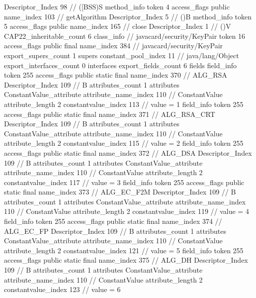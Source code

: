 {{{{{					Descriptor_Index	98		// ([BSS)S
				}
				method_info {
					token	4
					access_flags	public
					name_index	103		// getAlgorithm
					Descriptor_Index	5		// ()B
				}
				method_info {
					token	5
					access_flags	public
					name_index	165		// close
					Descriptor_Index	1		// ()V
				}
			}
			CAP22_inheritable_count	6
		}
		class_info {		// javacard/security/KeyPair
			token	16
			access_flags	public final
			name_index	384		// javacard/security/KeyPair
			export_supers_count	1
			supers {
				constant_pool_index	11		// java/lang/Object
			}
			export_interfaces_count	0
			interfaces {
			}
			export_fields_count	6
			fields {
			field_info {
				token	255
				access_flags	public static final
				name_index	370		// ALG_RSA
				Descriptor_Index	109		// B
				attributes_count	1
				attributes {
				ConstantValue_attribute {
					attribute_name_index	110		// ConstantValue
					attribute_length	2
					constantvalue_index	113		// value = 1
				}
				}
			}
			field_info {
				token	255
				access_flags	public static final
				name_index	371		// ALG_RSA_CRT
				Descriptor_Index	109		// B
				attributes_count	1
				attributes {
				ConstantValue_attribute {
					attribute_name_index	110		// ConstantValue
					attribute_length	2
					constantvalue_index	115		// value = 2
				}
				}
			}
			field_info {
				token	255
				access_flags	public static final
				name_index	372		// ALG_DSA
				Descriptor_Index	109		// B
				attributes_count	1
				attributes {
				ConstantValue_attribute {
					attribute_name_index	110		// ConstantValue
					attribute_length	2
					constantvalue_index	117		// value = 3
				}
				}
			}
			field_info {
				token	255
				access_flags	public static final
				name_index	373		// ALG_EC_F2M
				Descriptor_Index	109		// B
				attributes_count	1
				attributes {
				ConstantValue_attribute {
					attribute_name_index	110		// ConstantValue
					attribute_length	2
					constantvalue_index	119		// value = 4
				}
				}
			}
			field_info {
				token	255
				access_flags	public static final
				name_index	374		// ALG_EC_FP
				Descriptor_Index	109		// B
				attributes_count	1
				attributes {
				ConstantValue_attribute {
					attribute_name_index	110		// ConstantValue
					attribute_length	2
					constantvalue_index	121		// value = 5
				}
				}
			}
			field_info {
				token	255
				access_flags	public static final
				name_index	375		// ALG_DH
				Descriptor_Index	109		// B
				attributes_count	1
				attributes {
				ConstantValue_attribute {
					attribute_name_index	110		// ConstantValue
					attribute_length	2
					constantvalue_index	123		// value = 6
}}}}}}}

